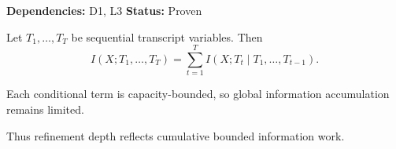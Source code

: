 \begin{lemma}
\textbf{Dependencies: } D1, L3
\textbf{Status: } Proven

Let $T_1,\dots,T_T$ be sequential transcript variables.
Then
\[
I(X;T_1,\dots,T_T)
= \sum_{t=1}^{T} I(X;T_t \mid T_1,\dots,T_{t-1}).
\]

Each conditional term is capacity-bounded,
so global information accumulation remains limited.

Thus refinement depth reflects cumulative bounded information work.
\end{lemma}
